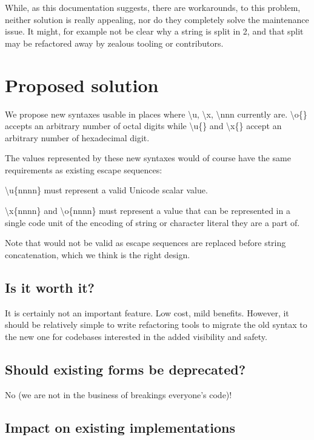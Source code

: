 \documentclass{wg21}
\begin{document}
While, as this documentation suggests, there are workarounds, to this problem, neither solution is really appealing, nor do
they completely solve the maintenance issue. It might, for example not be clear why a string is split in 2, and that split may
be refactored away by zealous tooling or contributors.

\section{Proposed solution}

We propose new syntaxes  usable in places where
\textbackslash u, \textbackslash x, \textbackslash nnn currently are.
\textbackslash o\{\} accepts an arbitrary number of octal digits while \textbackslash u\{\} and \textbackslash x\{\} accept
an arbitrary number of hexadecimal digit.

The values represented by these new syntaxes would of course have the same requirements as existing escape sequences:

\textbackslash u\{nnnn\} must represent a valid Unicode scalar value.

\textbackslash x\{nnnn\} and \textbackslash o\{nnnn\} must represent a value that can be represented in a single code unit of the encoding of string or character literal they are a part of.

Note that  would not be valid as escape sequences are replaced before string concatenation, which we think is the right design.


\subsection{Is it worth it?}

It is certainly not an important feature. Low cost, mild benefits.
However, it should be relatively simple to write refactoring tools to migrate the old syntax to the new one for codebases interested in the added visibility and safety.


\subsection{Should existing forms be deprecated?}

No (we are not in the business of breakings everyone's code)!

\subsection{Impact on existing implementations}
\end{document}
